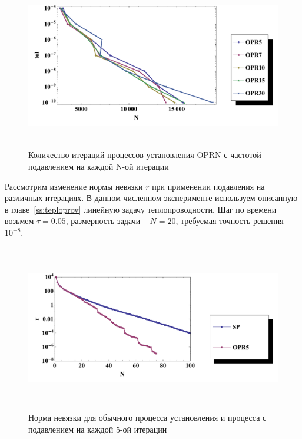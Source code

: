\documentclass[a4paper,14pt]{extreport}
\begin{document}
	 \begin{figure}[H]
	\begin{center}
	\includegraphics[height=7.3cm]{pics/num_ex_1_2.pdf}
	\caption{\small Количество итераций процессов установления OPRN с частотой подавлением на каждой N-ой итерации}
	\label{num_ex_1_2}
	\end{center}
	\end{figure}

Рассмотрим изменение нормы невязки $r$ при применении подавления на различных итерациях. В данном численном эксперименте используем описанную в главе~\ref{ss:teploprov} линейную задачу теплопроводности. Шаг по времени возьмем $\tau=0.05$, размерность задачи -- $N=20$, требуемая точность решения -- $10^{-8}$. 

	 \begin{figure}[H]
	\begin{center}
	\includegraphics[height=7.3cm]{pics/num_ex_1_1_1.pdf}
	\caption{\small Норма невязки для обычного процесса установления и процесса с подавлением на каждой 5-ой итерации}
	\label{num_ex_1_3}
	\end{center}
	\end{figure}
\end{document}
